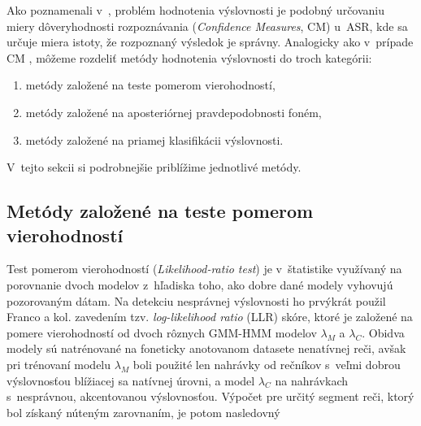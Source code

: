 Ako poznamenali v~\cite{Wei2009}, problém hodnotenia výslovnosti je podobný určovaniu miery dôveryhodnosti rozpoznávania (\textit{Confidence Measures}, CM) u~ASR, kde sa určuje miera istoty, že rozpoznaný výsledok je správny. Analogicky ako v~prípade CM \cite{Jiang2005}, môžeme rozdeliť metódy hodnotenia výslovnosti do troch kategórii:

\begin{enumerate}
    \item metódy založené na teste pomerom vierohodností,
    \item metódy založené na aposteriórnej pravdepodobnosti foném,
    \item metódy založené na priamej klasifikácii výslovnosti.
\end{enumerate}

\noindent V~tejto sekcii si podrobnejšie priblížime jednotlivé metódy.


\subsection{Metódy založené na teste pomerom vierohodností} \label{sec:llr-score}

Test pomerom vierohodností (\textit{Likelihood-ratio test}) je v~štatistike využívaný na porovnanie dvoch modelov z~hľadiska toho, ako dobre dané modely vyhovujú pozorovaným dátam. Na detekciu nesprávnej výslovnosti ho prvýkrát použil Franco a kol. \cite{Franco1999} zavedením tzv. \textit{log-likelihood ratio} (LLR) skóre, ktoré je založené na pomere vierohodností od dvoch rôznych GMM-HMM modelov $\lambda_M$ a $\lambda_C$. Obidva modely sú natrénované na foneticky anotovanom datasete nenatívnej reči, avšak pri trénovaní modelu $\lambda_M$ boli použité len nahrávky od rečníkov s~veľmi dobrou výslovnosťou blížiacej sa natívnej úrovni, a model $\lambda_C$ na nahrávkach s~nesprávnou, akcentovanou výslovnosťou. Výpočet pre určitý segment reči, ktorý bol získaný
núteným zarovnaním, je potom nasledovný

